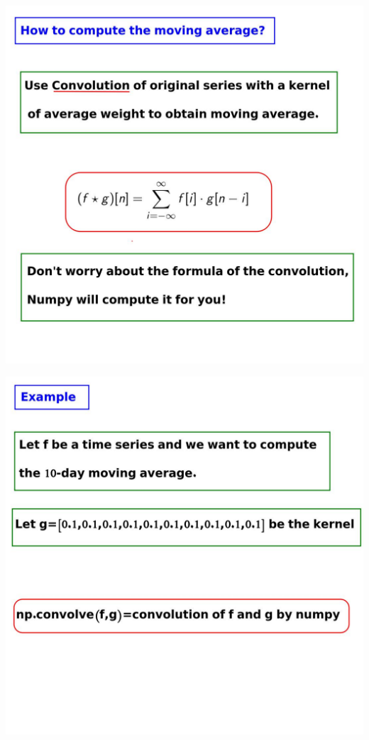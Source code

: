 \documentclass[12pt,aspectratio=169]{beamer}
\begin{document}
\begin{frame}
\begin{center}
\includegraphics[scale=0.3]{./pictures/3}
\end{center}
\end{frame}


\begin{frame}
\begin{center}
\includegraphics[scale=0.3]{./pictures/4}
\end{center}
\end{frame}
\end{document}
